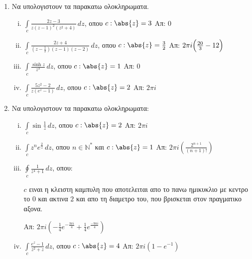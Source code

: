 



\everymath{\displaystyle}



\begin{center}
\end{center}

\vspace{\baselineskip} 

\begin{enumerate}

\item Να υπολογιστουν τα παρακατω ολοκληρωματα.

\begin{enumerate}[i)]

\item $\int\limits_c\frac{2z-3}{z(z-1)^2(z^2+4)}\,dz$, οπου $c:\abs{z}=3$ \hfill Απ: 0
\item $\int\limits_c\frac{2z+4}{(z-\frac{1}{2})(z-1)(z-2)}\,dz$, οπου $c:\abs{z}=\frac{3}{2}$ \hfill Απ: $2\pi i\Bigl(\frac{20}{3}-12\Bigr)$
\item $\int\limits_c\frac{\sinh z}{z^3}\,dz$, οπου $c:\abs{z}=1$ \hfill Απ: $0$
\item $\int\limits_c\frac{5z^2-2}{z(e^z-1)}\,dz$, οπου $c:\abs{z}=2$ \hfill Απ: $2\pi i$
\end{enumerate}

\item Να υπολογιστουν τα παρακατω ολοκληρωματα:

\begin{enumerate}[i)]

\item $\int\limits_c\sin \frac{1}{z}\,dz$, οπου $c:\abs{z}=2$ \hfill Απ: $2\pi i$

\item $\int\limits_c z^ne^{\frac{2}{z}}\,dz$, οπου $n\in\mathbb{N}^*$ και $c:\abs{z}=1$ \hfill Απ: $2\pi i (\frac{2^{n+1}}{(n+1)!})$

\item $\oint\limits_c\frac{1}{z^4+1}\,dz$, οπου:

$c$ ειναι η κλειστη καμπυλη που αποτελειται απο το πανω ημικυκλιο με κεντρο το $0$ και ακτινα $2$ και απο τη διαμετρο του, που βρισκεται στον πραγματικο αξονα. 

\hfill Απ: $2\pi i(-\frac{1}{4}e^{-\frac{3\pi i}{4}}+\frac{1}{4}e^{\frac{-9\pi i }{4}})$

\item $\int\limits_c\frac{e^z-1}{z^2+z}\,dz$, οπου $c:\abs{z}=4$ \hfill Απ: $2\pi i(1-e^{-1})$


\end{enumerate}
\end{enumerate}
